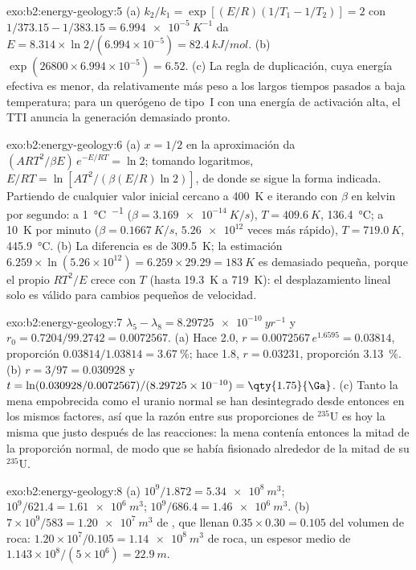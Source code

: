 \begin{solution}{exo:b2:energy-geology:5}
(a) $k_2/k_1 = \exp[(E/R)(1/T_1 - 1/T_2)] = 2$ con $1/373.15 - 1/383.15 = \qty{6.994e-5}{K^{-1}}$
da $E = 8.314 \times \ln 2/(6.994 \times 10^{-5}) = \qty{82.4}{kJ/mol}$. (b) $\exp(26800 \times
6.994 \times 10^{-5}) = 6.52$. (c) La regla de duplicación, cuya energía efectiva es menor, da
relativamente más peso a los largos tiempos pasados a baja temperatura; para un querógeno de tipo~I con una energía
de activación alta, el TTI anuncia la generación demasiado pronto.
\end{solution}

\begin{solution}{exo:b2:energy-geology:6}
(a) $x = 1/2$ en la aproximación da $(ART^2/\beta E)\,e^{-E/RT} = \ln 2$; tomando logaritmos,
$E/RT = \ln[AT^2/(\beta(E/R)\ln 2)]$, de donde se sigue la forma indicada. Partiendo de cualquier valor inicial cercano a
\qty{400}{K} e iterando con $\beta$ en kelvin por segundo: a \qty{1}{\celsius\per\Myr}
($\beta = \qty{3.169e-14}{K/s}$), $T = \qty{409.6}{K}$, \qty{136.4}{\celsius}; a \qty{10}{K} por
minuto ($\beta = \qty{0.1667}{K/s}$, $\num{5.26e12}$ veces más rápido), $T = \qty{719.0}{K}$,
\qty{445.9}{\celsius}. (b) La diferencia es de \qty{309.5}{K}; la estimación $6.259 \times
\ln(5.26 \times 10^{12}) = 6.259 \times 29.29 = \qty{183}{K}$ es demasiado pequeña, porque el propio $RT^2/E$
crece con $T$ (hasta \qty{19.3}{K} a \qty{719}{K}): el desplazamiento lineal solo es válido para cambios pequeños
de velocidad.
\end{solution}

\begin{solution}{exo:b2:energy-geology:7}
$\lambda_5 - \lambda_8 = \qty{8.29725e-10}{yr^{-1}}$ y $r_0 = 0.7204/99.2742 = 0.0072567$.
(a) Hace \qty{2.0}{\Ga}, $r = 0.0072567\,e^{1.6595} = 0.03814$, proporción $0.03814/1.03814 =
\qty{3.67}{\percent}$; hace \qty{1.8}{\Ga}, $r = 0.03231$, proporción \qty{3.13}{\percent}. (b) $r =
3/97 = 0.030928$ y $t = \ln(0.030928/0.0072567)/(8.29725 \times 10^{-10}) = \qty{1.75}{\Ga}$.
(c) Tanto la mena empobrecida como el uranio normal se han desintegrado desde entonces en los mismos factores, así que la razón entre
sus proporciones de $^{235}$U es hoy la misma que justo después de las reacciones: la mena contenía entonces la mitad de la
proporción normal, de modo que se había fisionado alrededor de la mitad de su $^{235}$U.
\end{solution}

\begin{solution}{exo:b2:energy-geology:8}
(a) $10^9/1.872 = \qty{5.34e8}{m^3}$; $10^9/621.4 = \qty{1.61e6}{m^3}$; $10^9/686.4 =
\qty{1.46e6}{m^3}$. (b) $7 \times 10^9/583 = \qty{1.20e7}{m^3}$ de , que llenan
$0.35 \times 0.30 = 0.105$ del volumen de roca: $1.20 \times 10^7/0.105 = \qty{1.14e8}{m^3}$ de roca,
un espesor medio de $1.143 \times 10^8/(5 \times 10^6) = \qty{22.9}{m}$.
\end{solution}

